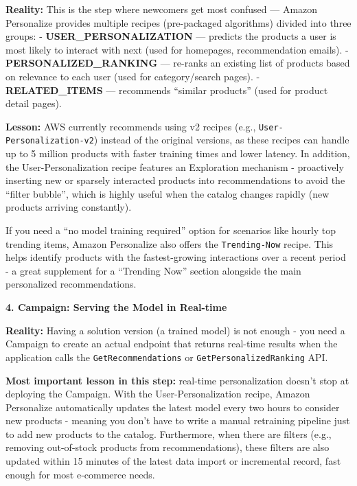 \textbf{Reality:} This is the step where newcomers get most confused ---
Amazon Personalize provides multiple recipes (pre-packaged algorithms)
divided into three groups: - \textbf{USER\_PERSONALIZATION} --- predicts
the products a user is most likely to interact with next (used for
homepages, recommendation emails). - \textbf{PERSONALIZED\_RANKING} ---
re-ranks an existing list of products based on relevance to each user
(used for category/search pages). - \textbf{RELATED\_ITEMS} ---
recommends ``similar products'' (used for product detail pages).

\textbf{Lesson:} AWS currently recommends using v2 recipes (e.g.,
\texttt{User-Personalization-v2}) instead of the original versions, as
these recipes can handle up to 5 million products with faster training
times and lower latency. In addition, the User-Personalization recipe
features an Exploration mechanism - proactively inserting new or
sparsely interacted products into recommendations to avoid the ``filter
bubble'', which is highly useful when the catalog changes rapidly (new
products arriving constantly).

If you need a ``no model training required'' option for scenarios like
hourly top trending items, Amazon Personalize also offers the
\texttt{Trending-Now} recipe. This helps identify products with the
fastest-growing interactions over a recent period - a great supplement
for a ``Trending Now'' section alongside the main personalized
recommendations.

\vspace{0.5em}\noindent\textbf{4. Campaign: Serving the Model in
Real-time}\par

\textbf{Reality:} Having a solution version (a trained model) is not
enough - you need a Campaign to create an actual endpoint that returns
real-time results when the application calls the
\texttt{GetRecommendations} or \texttt{GetPersonalizedRanking} API.

\textbf{Most important lesson in this step:} real-time personalization
doesn't stop at deploying the Campaign. With the User-Personalization
recipe, Amazon Personalize automatically updates the latest model every
two hours to consider new products - meaning you don't have to write a
manual retraining pipeline just to add new products to the catalog.
Furthermore, when there are filters (e.g., removing out-of-stock
products from recommendations), these filters are also updated within 15
minutes of the latest data import or incremental record, fast enough for
most e-commerce needs.

